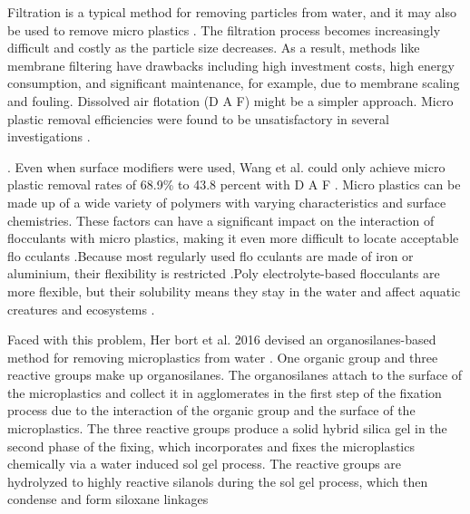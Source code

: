 \documentclass[12pt]{article}
\begin{document}
Filtration is a typical method for removing particles from water, and it may also be used to remove micro plastics . The filtration process becomes increasingly difficult and costly as the particle size decreases. As a result, methods like membrane filtering have drawbacks including high investment costs, high energy consumption, and significant maintenance, for example, due to membrane scaling and fouling. Dissolved air flotation (D A F)  might be a simpler approach. Micro plastic removal efficiencies were found to be unsatisfactory in several investigations .

. Even when  surface modifiers were used, Wang et al. could only achieve micro plastic removal rates of 68.9\% to 43.8 percent with D A F . Micro plastics can be made up of a wide variety of polymers with varying characteristics and surface chemistries. These factors can have a significant impact on the interaction of flocculants with micro plastics, making it even more difficult to locate acceptable flo cculants .Because most regularly used flo cculants are made of iron or aluminium, their flexibility is restricted .Poly electrolyte-based flocculants are more flexible, but their solubility means they stay in the water and affect aquatic creatures and ecosystems .

Faced with this problem, Her bort et al. 2016 devised an organosilanes-based method for removing microplastics from water . One organic group and three reactive groups make up organosilanes. The organosilanes attach to the surface of the microplastics and collect it in agglomerates in the first step of the fixation process due to the interaction of the organic group and the surface of the microplastics. The three reactive groups produce a solid hybrid silica gel in the second phase of the fixing, which incorporates and fixes the microplastics chemically via a water induced sol gel process. The reactive groups are hydrolyzed to highly reactive silanols during the sol gel process, which then condense and form siloxane linkages 
\end{document}
